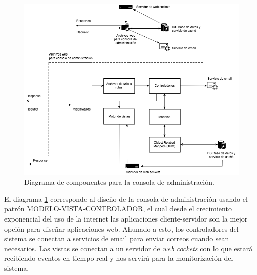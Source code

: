 \begin{figure}
	\centering
	\includegraphics[scale=.6]{images/Report_Viewer}
	\caption{Diagrama de componentes para la consola de administración.}
	\label{fig:ids_report}
\end{figure}

El diagrama \ref{fig:ids_report} corresponde al diseño de la consola de administración usando el patrón MODELO-VISTA-CONTROLADOR, el cual desde el crecimiento exponencial del uso de la internet las aplicaciones cliente-servidor son la mejor opción para diseñar aplicaciones web. Ahunado a esto, los controladores del sistema se conectan a servicios de email para enviar correos cuando sean necesarios. Las vistas se conectan a un servidor de \textit{web cockets} con lo que estará recibiendo eventos en tiempo real y nos servirá para la monitorización del sistema. \\

